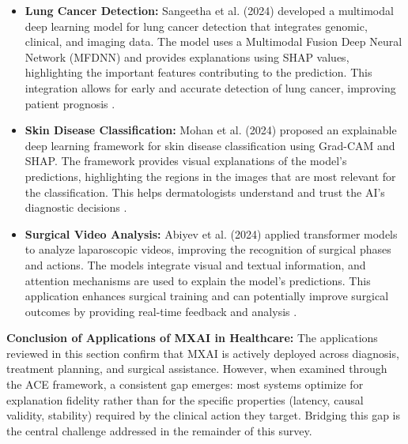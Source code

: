 \documentclass[pdflatex,sn-mathphys-num]{sn-jnl}%
\theoremstyle{thmstyleone}%
\theoremstyle{thmstyletwo}%
\theoremstyle{thmstylethree}%
\begin{document}
\begin{itemize}
\begin{itemize}
    \item \textbf{Lung Cancer Detection:} Sangeetha et al. (2024) developed a multimodal deep learning model for lung cancer detection that integrates genomic, clinical, and imaging data. The model uses a Multimodal Fusion Deep Neural Network (MFDNN) and provides explanations using SHAP values, highlighting the important features contributing to the prediction. This integration allows for early and accurate detection of lung cancer, improving patient prognosis \cite{wani2024deepxplainer}.
    \item \textbf{Skin Disease Classification:} Mohan et al. (2024) proposed an explainable deep learning framework for skin disease classification using Grad-CAM and SHAP. The framework provides visual explanations of the model's predictions, highlighting the regions in the images that are most relevant for the classification. This helps dermatologists understand and trust the AI's diagnostic decisions \cite{Mohan_2025}.
    \item \textbf{Surgical Video Analysis:} Abiyev et al. (2024) applied transformer models to analyze laparoscopic videos, improving the recognition of surgical phases and actions. The models integrate visual and textual information, and attention mechanisms are used to explain the model's predictions. This application enhances surgical training and can potentially improve surgical outcomes by providing real-time feedback and analysis \cite{rodis2024multimodalexplainableartificialintelligence}.
\end{itemize}

\textbf{Conclusion of Applications of MXAI in Healthcare:}
The applications reviewed in this section confirm that MXAI is actively deployed across diagnosis, treatment planning, and surgical assistance. However, when examined through the ACE framework, a consistent gap emerges: most systems optimize for explanation fidelity rather than for the specific properties (latency, causal validity, stability) required by the clinical action they target. Bridging this gap is the central challenge addressed in the remainder of this survey.


\end{itemize}
\end{document}
